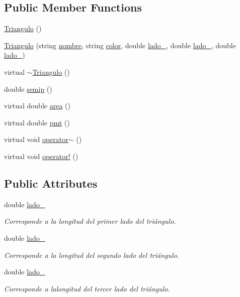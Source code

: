 \subsection*{Public Member Functions}
\begin{DoxyCompactItemize}
\item 
\hyperlink{class_triangulo_a905d421bd19655a979ccad9e2998db0c}{Triangulo} ()
\item 
\hyperlink{class_triangulo_a5649fe3785fa1c506b02f7fe64b00003}{Triangulo} (string \hyperlink{class_figura_a5be336617ed8a4d4f28115297b38da02}{nombre}, string \hyperlink{class_figura_a9f519b9504b95440f124a3099070e952}{color}, double \hyperlink{class_triangulo_a98c40cc40c68474e7c4b419b2b34b334}{lado\+\_}, double \hyperlink{class_triangulo_abec4003e2b29d33419dd928e2d0bdb4f}{lado\+\_}, double \hyperlink{class_triangulo_a4af14f654b0ddcf6415c0e11a2718fce}{lado\+\_})
\item 
virtual \hyperlink{class_triangulo_aca2be15b19831e8d7a5331808f5c1958}{$\sim$\+Triangulo} ()
\item 
double \hyperlink{class_triangulo_a03250f2b46b4f7d06eb2c88187cf34b8}{semip} ()
\item 
virtual double \hyperlink{class_triangulo_a1c71a04df8caa1bcb52898636fb20004}{area} ()
\item 
virtual double \hyperlink{class_triangulo_ab82a50fa3dd74bc55606738ce5e31f7d}{pmt} ()
\item 
virtual void \hyperlink{class_triangulo_af7fc480161706ec74ece32e9ef1fed7f}{operator$\sim$} ()
\item 
virtual void \hyperlink{class_triangulo_ae0552ffa9641d36e1f571349e5de1070}{operator!} ()
\end{DoxyCompactItemize}
\subsection*{Public Attributes}
\begin{DoxyCompactItemize}
\item 
double \hyperlink{class_triangulo_a98c40cc40c68474e7c4b419b2b34b334}{lado\+\_}
\begin{DoxyCompactList}\small\item\em Corresponde a la longitud del primer lado del triángulo. \end{DoxyCompactList}\item 
double \hyperlink{class_triangulo_abec4003e2b29d33419dd928e2d0bdb4f}{lado\+\_}
\begin{DoxyCompactList}\small\item\em Corresponde a la longitud del segundo lado del triángulo. \end{DoxyCompactList}\item 
double \hyperlink{class_triangulo_a4af14f654b0ddcf6415c0e11a2718fce}{lado\+\_}
\begin{DoxyCompactList}\small\item\em Corresponde a lalongitud del tercer lado del triángulo. \end{DoxyCompactList}\end{DoxyCompactItemize}


